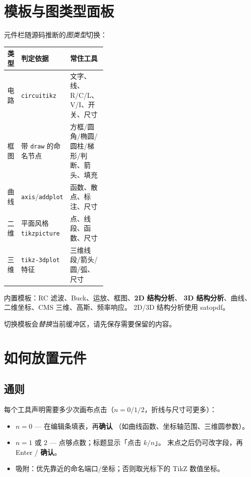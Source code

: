 \documentclass[a4paper]{ltxdoc}
\newcommand{\ui}[1]{\textbf{#1}}
\begin{document}
\section{模板与图类型面板}

元件栏随源码推断的\emph{图类型}切换：

\begin{center}
{\small
\begin{tabular}{@{}llp{0.40\linewidth}@{}}
\toprule
类型 & 判定依据 & 常住工具 \\
\midrule
电路 & \texttt{circuitikz} & 文字、线、R/C/L、V/I、开关、尺寸 \\
框图 & 带 \texttt{draw} 的命名节点 & 方框/圆角/椭圆/圆柱/梯形/判断、箭头、填充 \\
曲线 & \texttt{axis}/\texttt{addplot} & 函数、散点、标注、尺寸 \\
二维 & 平面风格 \texttt{tikzpicture} & 点、线段、函数、尺寸 \\
三维 & \texttt{tikz-3dplot} 特征 & 三维线段/箭头/圆/弧、尺寸 \\
\bottomrule
\end{tabular}}
\end{center}

内置模板：RC 滤波、Buck、运放、框图、\textbf{2D 结构分析}、
\textbf{3D 结构分析}、曲线、二维坐标、CMS 三维、高斯、频率响应。
2D/3D 结构分析使用 \textsf{satopdf}。

切换模板会\emph{替换}当前缓冲区，请先保存需要保留的内容。

\section{如何放置元件}
\label{sec:place}

\subsection{通则}
每个工具声明需要多少次画布点击（$n=0/1/2$，折线与尺寸可更多）：

\begin{itemize}[nosep]
  \item $n=0$ --- 在编辑条填表，再\ui{确认}
        （如曲线函数、坐标轴范围、三维圆参数）。
  \item $n=1$ 或 $2$ --- 点够点数；标题显示「点击 $k/n$」。
        末点之后仍可改字段，再 Enter / \ui{确认}。
  \item 吸附：优先靠近的命名端口/坐标；否则取光标下的 TikZ 数值坐标。
\end{itemize}
\end{document}
